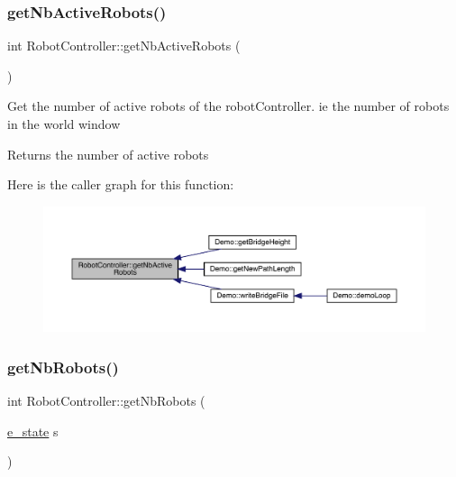 \subsubsection{\texorpdfstring{get\+Nb\+Active\+Robots()}{getNbActiveRobots()}}
{\footnotesize\ttfamily int Robot\+Controller\+::get\+Nb\+Active\+Robots (\begin{DoxyParamCaption}{ }\end{DoxyParamCaption})}

Get the number of active robots of the robot\+Controller. ie the number of robots in the world window \begin{DoxyReturn}{Returns}
the number of active robots 
\end{DoxyReturn}
Here is the caller graph for this function\+:\nopagebreak
\begin{figure}[H]
\begin{center}
\leavevmode
\includegraphics[width=350pt]{class_robot_controller_a45a4e25b2bb49bf2f1dc18b0f21a6f8d_icgraph}
\end{center}
\end{figure}
\mbox{\label{class_robot_controller_a612d9355c9638b9f0bb24348647ada45}} 
\subsubsection{\texorpdfstring{get\+Nb\+Robots()}{getNbRobots()}}
{\footnotesize\ttfamily int Robot\+Controller\+::get\+Nb\+Robots (\begin{DoxyParamCaption}\item[{\mbox{\hyperlink{_robot_8h_a74a75e4700f1f71bb89d80765319e57b}{e\+\_\+state}}}]{s }\end{DoxyParamCaption})}

